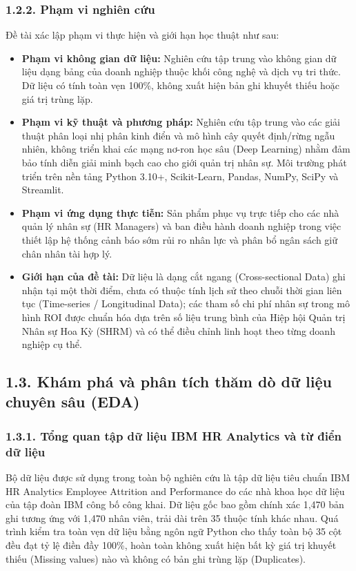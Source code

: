 \documentclass[12pt,a4paper]{article}
\begin{document}
\subsubsection{1.2.2. Phạm vi nghiên cứu}
Đề tài xác lập phạm vi thực hiện và giới hạn học thuật như sau:
\begin{itemize}
    \item \textbf{Phạm vi không gian dữ liệu:} Nghiên cứu tập trung vào không gian dữ liệu dạng bảng của doanh nghiệp thuộc khối công nghệ và dịch vụ tri thức. Dữ liệu có tính toàn vẹn 100\%, không xuất hiện bản ghi khuyết thiếu hoặc giá trị trùng lặp.
    \item \textbf{Phạm vi kỹ thuật và phương pháp:} Nghiên cứu tập trung vào các giải thuật phân loại nhị phân kinh điển và mô hình cây quyết định/rừng ngẫu nhiên, không triển khai các mạng nơ-ron học sâu (Deep Learning) nhằm đảm bảo tính diễn giải minh bạch cao cho giới quản trị nhân sự. Môi trường phát triển trên nền tảng Python 3.10+, Scikit-Learn, Pandas, NumPy, SciPy và Streamlit.
    \item \textbf{Phạm vi ứng dụng thực tiễn:} Sản phẩm phục vụ trực tiếp cho các nhà quản lý nhân sự (HR Managers) và ban điều hành doanh nghiệp trong việc thiết lập hệ thống cảnh báo sớm rủi ro nhân lực và phân bổ ngân sách giữ chân nhân tài hợp lý.
    \item \textbf{Giới hạn của đề tài:} Dữ liệu là dạng cắt ngang (Cross-sectional Data) ghi nhận tại một thời điểm, chưa có thuộc tính lịch sử theo chuỗi thời gian liên tục (Time-series / Longitudinal Data); các tham số chi phí nhân sự trong mô hình ROI được chuẩn hóa dựa trên số liệu trung bình của Hiệp hội Quản trị Nhân sự Hoa Kỳ (SHRM) và có thể điều chỉnh linh hoạt theo từng doanh nghiệp cụ thể.
\end{itemize}

\subsection{1.3. Khám phá và phân tích thăm dò dữ liệu chuyên sâu (EDA)}

\subsubsection{1.3.1. Tổng quan tập dữ liệu IBM HR Analytics và từ điển dữ liệu}
Bộ dữ liệu được sử dụng trong toàn bộ nghiên cứu là tập dữ liệu tiêu chuẩn IBM HR Analytics Employee Attrition and Performance do các nhà khoa học dữ liệu của tập đoàn IBM công bố công khai. Dữ liệu gốc bao gồm chính xác 1,470 bản ghi tương ứng với 1,470 nhân viên, trải dài trên 35 thuộc tính khác nhau. Quá trình kiểm tra toàn vẹn dữ liệu bằng ngôn ngữ Python cho thấy toàn bộ 35 cột đều đạt tỷ lệ điền đầy 100\%, hoàn toàn không xuất hiện bất kỳ giá trị khuyết thiếu (Missing values) nào và không có bản ghi trùng lặp (Duplicates).
\end{document}

